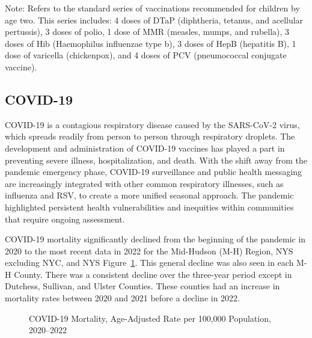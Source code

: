 \documentclass[
  english,
  letterpaper,
]{report}
\begin{document}
\begin{tcolorbox}[enhanced jigsaw, breakable, leftrule=.75mm, title=\textcolor{quarto-callout-note-color}{\faInfo}\hspace{0.5em}{Note}, bottomrule=.15mm, opacityback=0, left=2mm, colback=white, bottomtitle=1mm, coltitle=black, colbacktitle=quarto-callout-note-color!10!white, colframe=quarto-callout-note-color-frame, opacitybacktitle=0.6, toptitle=1mm, titlerule=0mm, arc=.35mm, rightrule=.15mm, toprule=.15mm]

Note: Refers to the standard series of vaccinations recommended for
children by age two. This series includes: 4 doses of DTaP (diphtheria,
tetanus, and acellular pertussis), 3 doses of polio, 1 dose of MMR
(measles, mumps, and rubella), 3 doses of Hib (Haemophilus influenzae
type b), 3 doses of HepB (hepatitis B), 1 dose of varicella
(chickenpox), and 4 doses of PCV (pneumococcal conjugate vaccine).

\end{tcolorbox}

\subsection{COVID-19}\label{covid-19}

COVID-19 is a contagious respiratory disease caused by the SARS-CoV-2
virus, which spreads readily from person to person through respiratory
droplets. The development and administration of COVID-19 vaccines has
played a part in preventing severe illness, hospitalization, and death.
With the shift away from the pandemic emergency phase, COVID-19
surveillance and public health messaging are increasingly integrated
with other common respiratory illnesses, such as influenza and RSV, to
create a more unified seasonal approach. The pandemic highlighted
persistent health vulnerabilities and inequities within communities that
require ongoing assessment.

COVID-19 mortality significantly declined from the beginning of the
pandemic in 2020 to the most recent data in 2022 for the Mid-Hudson
(M-H) Region, NYS excluding NYC, and NYS
Figure~\ref{fig-covid-mort-aar}. This general decline was also seen in
each M-H County. There was a consistent decline over the three-year
period except in Dutchess, Sullivan, and Ulster Counties. These counties
had an increase in mortality rates between 2020 and 2021 before a
decline in 2022.

\begin{figure}


\caption{\label{fig-covid-mort-aar}COVID-19 Mortality, Age-Adjusted Rate
per 100,000 Population, 2020--2022}

\end{figure}%
\end{document}
